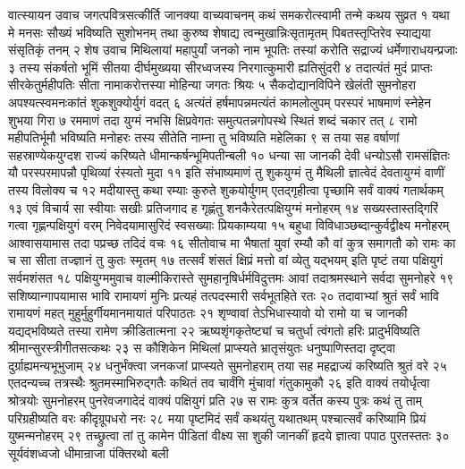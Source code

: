 वात्स्यायन उवाच
जगत्पवित्रसत्कीर्ति जानक्या वाच्यवाचनम्
कथं समकरोत्स्वामी तन्मे कथय सुव्रत १
यथा मे मनसः सौख्यं भविष्यति सुशोभनम्
तथा कुरुष्व शेषाद्य त्वन्मुखान्निःसृतामृतम्
पिबतस्तृप्तिरेव स्याद्यया संसृतिकृं तनम् २
शेष उवाच
मिथिलायां महापुर्यां जनको नाम भूपतिः
तस्यां करोति सद्राज्यं धर्मेणाराधयन्प्रजाः ३
तस्य संकर्षतो भूमिं सीतया दीर्घमुख्यया
सीरध्वजस्य निरगात्कुमारी ह्यतिसुंदरी ४
तदात्यंतं मुदं प्राप्तः सीरकेतुर्महीपतिः
सीता नामाकरोत्तस्या मोहिन्या जगतः श्रियः ५
सैकदोद्यानविपिने खेलंती सुमनोहरा
अपश्यत्स्वमनःकांतं शुकशुक्योर्युगं वदत् ६
अत्यंतं हर्षमापन्नमत्यंतं कामलोलुपम्
परस्परं भाषमाणं स्नेहेन शुभया गिरा ७
रममाणं तदा युग्मं नभसि क्षिप्रवेगतः
समुत्पतन्नगोपस्थे स्थितं शब्दं चकार तत् ८
रामो महीपतिर्भूमौ भविष्यति मनोहरः
तस्य सीतेति नाम्ना तु भविष्यति महेलिका ९
स तया सह वर्षाणां सहस्राण्येकयुग्दश
राज्यं करिष्यते धीमान्कर्षन्भूमिपतीन्बली १०
धन्या सा जानकी देवी धन्योऽसौ रामसंज्ञितः
यौ परस्परमापन्नौ पृथिव्यां रंस्यतो मुदा ११
इति संभाष्यमाणं तु शुकयुग्मं तु मैथिली
ज्ञात्वेदं देवतायुग्मं वाणीं तस्य विलोक्य च १२
मदीयास्तु कथा रम्याः कुरुते शुकयोर्युगम्
एतद्गृहीत्वा पृच्छामि सर्वं वाक्यं गतार्थकम् १३
एवं विचार्य सा स्वीयाः सखीः प्रतिजगाद ह
गृह्णंतु शनकैरेतत्पक्षियुग्मं मनोहरम् १४
सख्यस्तास्तद्गिरिं गत्वा गृह्णन्पक्षियुगं वरम्
निवेदयामासुरिदं स्वसख्याः प्रियकाम्यया १५
बहुधा विविधाञ्छब्दान्कुर्वद्वीक्ष्य मनोहरम्
आश्वासयामास तदा पप्रच्छ तदिदं वचः १६
सीतोवाच
मा भैषातां युवां रम्यौ कौ वां कुत्र समागतौ
को रामः का च सा सीता तज्ज्ञानं तु कुतः स्मृतम् १७
तत्सर्वं शंसतं क्षिप्रं मत्तो वां व्येतु यद्भयम्
इति पृष्टं तया पक्षियुगं सर्वमशंसत १८
पक्षियुग्ममुवाच
वाल्मीकिरास्ते सुमहानृषिर्धर्मविदुत्तमः
आवां तदाश्रमस्थाने सर्वदा सुमनोहरे १९
सशिष्यान्गापयामास भावि रामायणं मुनिः
प्रत्यहं तत्पदस्मारी सर्वभूतहिते रतः २०
तदावाभ्यां श्रुतं सर्वं भावि रामायणं महत्
मुहुर्मुहुर्गीयमानमायातं परिपाठतः २१
शृण्वावां तेऽभिधास्यावो यो रामो या च जानकी
यद्यद्भविष्यते तस्या रामेण क्रीडितात्मना २२
ऋष्यशृंगकृतेष्ट्यां च चतुर्धा त्वंगतो हरिः
प्रादुर्भविष्यति श्रीमान्सुरस्त्रीगीतसत्कथः २३
स कौशिकेन मिथिलां प्राप्स्यते भ्रातृसंयुतः
धनुष्पाणिस्तदा दृष्ट्वा दुर्ग्राह्यमन्यभूभुजाम् २४
धनुर्भंक्त्वा जनकजां प्राप्स्यते सुमनोहराम्
तया सह महद्राज्यं करिष्यति श्रुतं वरे २५
एतदन्यच्च तत्रस्थैः श्रुतमस्माभिरुद्गतैः
कथितं तव चार्वंगि मुंचावां गंतुकामुकौ २६
इति वाक्यं तयोर्धृत्वा श्रोत्रयोः सुमनोहरम्
पुनरेवजगादेदं वाक्यं पक्षियुगं प्रति २७
स रामः कुत्र वर्तेत कस्य पुत्रः कथं तु ताम्
परिग्रहीष्यति वरः कीदृग्रूपधरो नरः २८
मया पृष्टमिदं सर्वं कथयंतु यथातथम्
पश्चात्सर्वं करिष्यामि प्रियं युष्मन्मनोहरम् २९
तच्छ्रुत्वा तां तु कामेन पीडितां वीक्ष्य सा शुकी
जानकीं हृदये ज्ञात्वा पपाठ पुरतस्ततः ३०
सूर्यवंशध्वजो धीमान्राजा पंक्तिरथो बली
